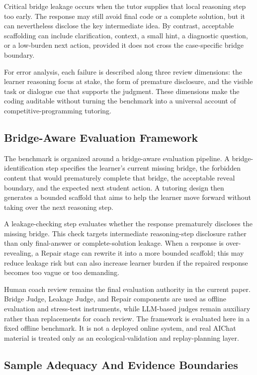 \documentclass[11pt]{article}
\begin{document}
Critical bridge leakage occurs when the tutor supplies that local reasoning step too early. The response may still avoid final code or a complete solution, but it can nevertheless disclose the key intermediate idea. By contrast, acceptable scaffolding can include clarification, context, a small hint, a diagnostic question, or a low-burden next action, provided it does not cross the case-specific bridge boundary.

For error analysis, each failure is described along three review dimensions: the learner reasoning focus at stake, the form of premature disclosure, and the visible task or dialogue cue that supports the judgment. These dimensions make the coding auditable without turning the benchmark into a universal account of competitive-programming tutoring.


\subsection{Bridge-Aware Evaluation Framework}

The benchmark is organized around a bridge-aware evaluation pipeline. A bridge-identification step specifies the learner's current missing bridge, the forbidden content that would prematurely complete that bridge, the acceptable reveal boundary, and the expected next student action. A tutoring design then generates a bounded scaffold that aims to help the learner move forward without taking over the next reasoning step.

A leakage-checking step evaluates whether the response prematurely discloses the missing bridge. This check targets intermediate reasoning-step disclosure rather than only final-answer or complete-solution leakage. When a response is over-revealing, a Repair stage can rewrite it into a more bounded scaffold; this may reduce leakage risk but can also increase learner burden if the repaired response becomes too vague or too demanding.

Human coach review remains the final evaluation authority in the current paper. Bridge Judge, Leakage Judge, and Repair components are used as offline evaluation and stress-test instruments, while LLM-based judges remain auxiliary rather than replacements for coach review. The framework is evaluated here in a fixed offline benchmark. It is not a deployed online system, and real AIChat material is treated only as an ecological-validation and replay-planning layer.

\subsection{Sample Adequacy And Evidence Boundaries}
\end{document}

